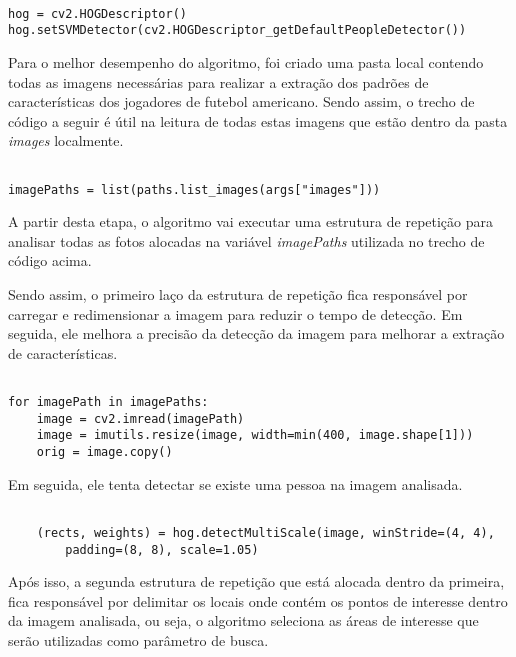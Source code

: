 \begin{verbatim}

hog = cv2.HOGDescriptor()
hog.setSVMDetector(cv2.HOGDescriptor_getDefaultPeopleDetector())

\end{verbatim}

Para o melhor desempenho do algoritmo, foi criado uma pasta local contendo todas as imagens necessárias para realizar a extração dos padrões de características dos jogadores de futebol americano. Sendo assim, o trecho de código a seguir é útil na leitura de todas estas imagens que estão dentro da pasta \textit{images} localmente.

\begin{verbatim}

imagePaths = list(paths.list_images(args["images"]))

\end{verbatim}

A partir desta etapa, o algoritmo vai executar uma estrutura de repetição para analisar todas as fotos alocadas na variável \textit{imagePaths} utilizada no trecho de código acima.

Sendo assim, o primeiro laço da estrutura de repetição fica responsável por carregar e redimensionar a imagem para reduzir o tempo de detecção. Em seguida, ele melhora a precisão da detecção da imagem para melhorar a extração de características.

\begin{verbatim}

for imagePath in imagePaths:
	image = cv2.imread(imagePath)
	image = imutils.resize(image, width=min(400, image.shape[1]))
	orig = image.copy()

\end{verbatim}

Em seguida, ele tenta detectar se existe uma pessoa na imagem analisada.

\begin{verbatim}

    (rects, weights) = hog.detectMultiScale(image, winStride=(4, 4),
        padding=(8, 8), scale=1.05)

\end{verbatim}

Após isso, a segunda estrutura de repetição que está alocada dentro da primeira, fica responsável por delimitar os locais onde contém os pontos de interesse dentro da imagem analisada, ou seja, o algoritmo seleciona as áreas de interesse que serão utilizadas como parâmetro de busca.

